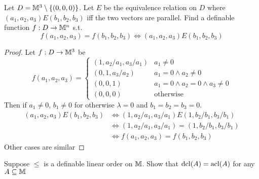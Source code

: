 \documentclass[11pt]{article}
\begin{document}
\begin{exercise}
Let \(D=\mathbb{M}^3\setminus\{(0,0,0)\}\). Let \(E\) be the equivalence relation on \(D\)
where \((a_1,a_2,a_3)E(b_1,b_2,b_3)\) iff the two vectors are parallel. Find a definable
function \(f:D\to\mathbb{M}^n\) s.t.
\begin{equation*}
f(a_1,a_2,a_3)=f(b_1,b_2,b_3)\Leftrightarrow(a_1,a_2,a_3)E(b_1,b_2,b_3)
\end{equation*}
\end{exercise}

\begin{proof}
Let \(f:D\to\mathbb{M}^3\) be
\begin{equation*}
f(a_1,a_2,a_3)=
\begin{cases}
(1,a_2/a_1,a_3/a_1)&a_1\neq 0\\
(0,1,a_3/a_2)&a_1=0\wedge a_2\neq 0\\
(0,0,1)&a_1=0\wedge a_2=0\wedge a_3\neq 0\\
(0,0,0)&\text{otherwise}
\end{cases}
\end{equation*}
Then if \(a_1\neq 0\), \(b_1\neq 0\) for otherwise \(\lambda=0\) and \(b_1=b_2=b_3=0\).
\begin{align*}
(a_1,a_2,a_3)E(b_1,b_2,b_3)&\Leftrightarrow(1,a_2/a_1,a_3/a_1)E(1,b_2/b_1,b_3/b_1)\\
&\Leftrightarrow(1,a_2/a_1,a_3/a_1)=(1,b_2/b_1,b_3/b_1)\\
&\Leftrightarrow f(a_1,a_2,a_3)=f(b_1,b_2,b_3)
\end{align*}
Other cases are similar
\end{proof}

\begin{exercise}
Suppose \(\le\) is a definable linear order on \(\mathbb{M}\). Show that \(\operatorname{dcl}(A)=\operatorname{acl}(A)\) for any \(A\subseteq\mathbb{M}\)
\end{exercise}
\end{document}
